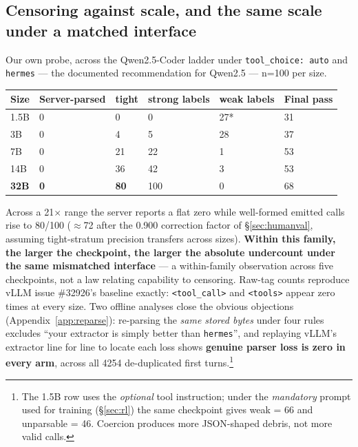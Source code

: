 \subsection{Censoring against scale, and the same scale under a matched interface}
\label{sec:scale}

Our own probe, across the Qwen2.5-Coder ladder under \texttt{tool\_choice: auto} and
\texttt{hermes} --- the documented recommendation for Qwen2.5 --- n=100 per size.

\begin{center}
\small
{}\label{tab:scale}
\begin{tabular}{@{}llllll@{}}
\toprule
Size & Server-parsed & \textbf{tight} & strong labels & weak labels & Final pass \\
\midrule
1.5B & 0 & 0 & 0 & 27* & 31 \\
3B & 0 & 4 & 5 & 28 & 37 \\
7B & 0 & 21 & 22 & 1 & 53 \\
14B & 0 & 36 & 42 & 3 & 53 \\
\textbf{32B} & \textbf{0} & \textbf{80} & 100 & 0 & 68 \\
\bottomrule
\end{tabular}
\end{center}

Across a 21$\times$ range the server reports a flat zero while well-formed emitted calls rise to
80/100 ($\approx$72 after the 0.900 correction factor of \S\ref{sec:humanval}, assuming
tight-stratum precision transfers across sizes).
\textbf{Within this family, the larger the checkpoint, the larger the absolute undercount under
the same mismatched interface} --- a within-family observation across five checkpoints, not a law
relating capability to censoring. Raw-tag counts reproduce vLLM issue \#32926's baseline exactly:
\texttt{<tool\_call>} and \texttt{<tools>} appear zero times at every size. Two offline analyses
close the obvious objections (Appendix~\ref{app:reparse}): re-parsing the \emph{same stored bytes}
under four rules excludes ``your extractor is simply better than \texttt{hermes}'', and replaying
vLLM's extractor line for line to locate each loss shows \textbf{genuine parser loss is zero in
every arm}, across all 4254 de-duplicated first turns.\footnote{The 1.5B row uses the
\emph{optional} tool instruction; under the \emph{mandatory} prompt used for training
(\S\ref{sec:rl}) the same checkpoint gives weak = 66 and unparsable = 46. Coercion produces more
JSON-shaped debris, not more valid calls.}

